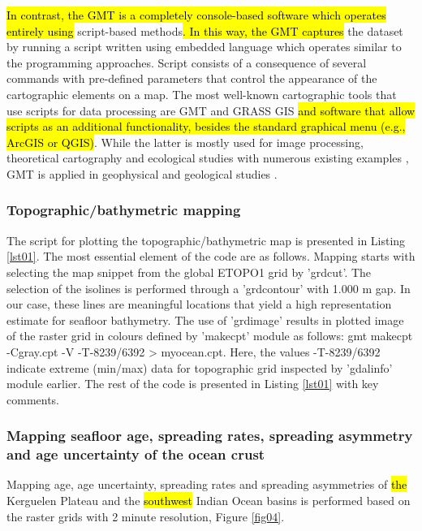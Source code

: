 \documentclass[geomatics,article,submit,pdftex,moreauthors]{Definitions/mdpi}
\begin{document}
\hl{In contrast, the GMT is a completely console-based software which operates entirely using }script-based methods\hl{. In this way, the GMT captures} the dataset by running a script written using embedded language which operates similar to the programming approaches. Script consists of a consequence of several commands with pre-defined parameters that control the appearance of the cartographic elements on a map. The most well-known cartographic tools that use scripts for data processing are GMT \cite{Lemenkova202217} and GRASS GIS \cite{NETELER2012124}\hl{ and software that allow scripts as an additional functionality, besides the standard graphical menu (e.g., ArcGIS or QGIS)}. While the latter is mostly used for image processing, theoretical cartography and ecological studies with numerous existing examples  \cite{ROCCHINI2017166,FRIGERI20111265,Lemenkova202313,SOROKINE2007685}, GMT is applied in geophysical and geological studies \cite{Lee,Lemenkova202206,DeSanto}.

\subsubsection{Topographic/bathymetric mapping}

The script for plotting the topographic/bathymetric map is presented in Listing \ref{lst01}.\hl{ }The most essential element of the code are as follows. Mapping starts with selecting the map snippet from the global ETOPO1 grid by 'grdcut'. The selection of the isolines is performed through a 'grdcontour' with 1.000 m gap. In our case, these lines are meaningful locations that yield a high representation estimate for seafloor bathymetry. The use of 'grdimage' results in plotted image of the raster grid in colours defined by 'makecpt' module as follows: gmt makecpt -Cgray.cpt -V -T-8239/6392 > myocean.cpt. Here, the values -T-8239/6392 indicate extreme (min/max) data for topographic grid inspected by 'gdalinfo' module earlier. The rest of the code is presented in Listing \ref{lst01} with key comments.

\subsubsection{Mapping seafloor age, spreading rates, spreading asymmetry and age uncertainty of the ocean crust}

Mapping age, age uncertainty, spreading rates and spreading asymmetries of \hl{the }Kerguelen Plateau and the \hl{southwest} Indian Ocean basins is performed based on the raster grids with 2 minute resolution, Figure \ref{fig04}.  
\end{document}
